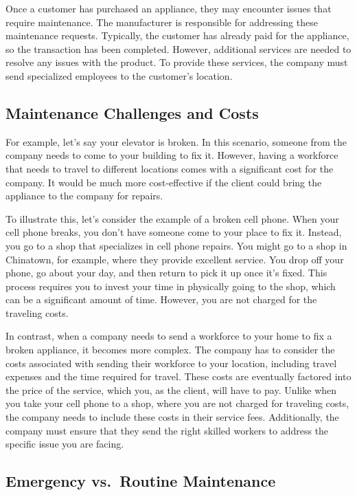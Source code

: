 Once a customer has purchased an appliance, they may encounter issues
that require maintenance. The manufacturer is responsible for addressing
these maintenance requests. Typically, the customer has already paid for
the appliance, so the transaction has been completed. However,
additional services are needed to resolve any issues with the product.
To provide these services, the company must send specialized employees
to the customer's location.

\subsection{Maintenance Challenges and
    Costs}\label{maintenance-challenges-and-costs}

For example, let's say your elevator is broken. In this scenario,
someone from the company needs to come to your building to fix it.
However, having a workforce that needs to travel to different locations
comes with a significant cost for the company. It would be much more
cost-effective if the client could bring the appliance to the company
for repairs.

To illustrate this, let's consider the example of a broken cell phone.
When your cell phone breaks, you don't have someone come to your place
to fix it. Instead, you go to a shop that specializes in cell phone
repairs. You might go to a shop in Chinatown, for example, where they
provide excellent service. You drop off your phone, go about your day,
and then return to pick it up once it's fixed. This process requires you
to invest your time in physically going to the shop, which can be a
significant amount of time. However, you are not charged for the
traveling costs.

In contrast, when a company needs to send a workforce to your home to
fix a broken appliance, it becomes more complex. The company has to
consider the costs associated with sending their workforce to your
location, including travel expenses and the time required for travel.
These costs are eventually factored into the price of the service, which
you, as the client, will have to pay. Unlike when you take your cell
phone to a shop, where you are not charged for traveling costs, the
company needs to include these costs in their service fees.
Additionally, the company must ensure that they send the right skilled
workers to address the specific issue you are facing.

\subsection{Emergency vs.~Routine
    Maintenance}\label{emergency-vs.-routine-maintenance}

